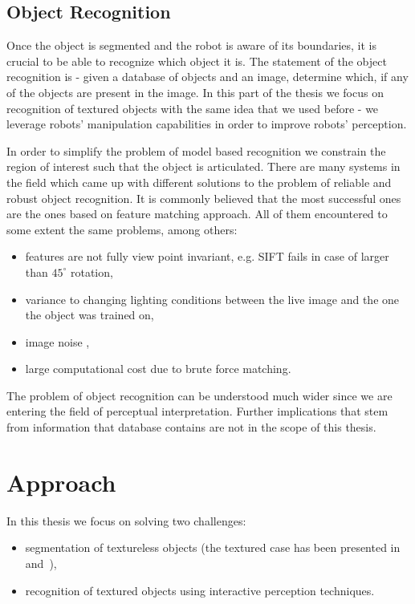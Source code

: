 \subsection{Object Recognition}

Once the object is segmented and the robot is aware of its boundaries, it is crucial to be able to recognize which object it is. The statement of the object recognition is -  
given a database of objects and an image, determine which, if any of the objects are present in the image. In this part of the thesis we focus on recognition of textured objects with the same idea that we used before - we leverage robots' manipulation capabilities in order to improve robots' perception.

In order to simplify the problem of model based recognition we constrain the region of interest such that the object is articulated. There are many systems in the field which came up with different solutions to the problem of reliable and robust object recognition. It is commonly believed that the most successful ones are the ones based on feature matching approach. All of them encountered to some extent the same problems, among others:

\begin{itemize}
\item features are not fully view point invariant, e.g. SIFT fails in case of larger than
$45^\circ$ rotation,
\item  variance to changing lighting conditions between the live
image and the one the object was trained on,
\item image noise ,
\item large computational cost due to brute force matching.
\end{itemize}

The problem of object recognition can be understood much wider since we are entering the field of perceptual interpretation. Further implications that stem from information that database contains are not in the scope of this thesis.



\section{Approach} 

In this thesis we focus on solving two challenges: 

\begin{itemize} 
\item segmentation of textureless objects (the textured case has been presented in~\cite{bersch12interactive} and~\cite{Katz-WS-MM-ICRA2011}),

\item recognition of textured objects using interactive perception techniques.
\end{itemize} 

